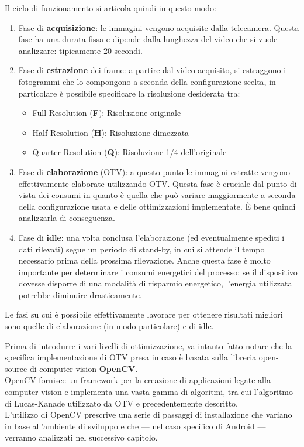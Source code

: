 Il ciclo di funzionamento si articola quindi in questo modo:
\begin{enumerate}
    \item Fase di \textbf{acquisizione}: le immagini vengono acquisite dalla telecamera. Questa fase ha una durata fissa e dipende
    dalla lunghezza del video che si vuole analizzare: tipicamente 20 secondi.
    \item Fase di \textbf{estrazione} dei frame: a partire dal video acquisito, si estraggono i fotogrammi che lo compongono a seconda
    della configurazione scelta, in particolare è possibile specificare la risoluzione desiderata tra:
    \begin{itemize}
        \item Full Resolution (\textbf{F}): Risoluzione originale
        \item Half Resolution (\textbf{H}): Risoluzione dimezzata
        \item Quarter Resolution (\textbf{Q}): Risoluzione 1/4 dell'originale
    \end{itemize}
    \item Fase di \textbf{elaborazione} (OTV): a questo punto le immagini estratte vengono effettivamente elaborate utilizzando
    OTV. Questa fase è cruciale dal punto di vista dei consumi in quanto è quella che può variare maggiormente a seconda della
    configurazione usata e delle ottimizzazioni implementate. È bene quindi analizzarla di conseguenza.
    \item Fase di \textbf{idle}: una volta conclusa l'elaborazione (ed eventualmente spediti i dati rilevati) segue un periodo di stand-by,
    in cui si attende il tempo necessario prima della prossima rilevazione. Anche questa fase è molto importante per determinare
    i consumi energetici del processo: se il dispositivo dovesse disporre di una modalità di risparmio energetico, 
    l'energia utilizzata potrebbe diminuire drasticamente.
\end{enumerate}

Le fasi su cui è possibile effettivamente lavorare per ottenere risultati migliori sono quelle di elaborazione (in modo particolare)
e di idle.


Prima di introdurre i vari livelli di ottimizzazione, va intanto fatto notare che la specifica implementazione di OTV presa in
caso è basata sulla libreria open-source di computer vision \textbf{OpenCV}.\\
OpenCV fornisce un framework per la creazione di applicazioni legate alla computer vision e implementa una vasta gamma di
algoritmi, tra cui l'algoritmo di Lucas-Kanade utilizzato da OTV e precedentemente descritto.\\
L'utilizzo di OpenCV prescrive una serie di passaggi di installazione che variano in base all'ambiente di sviluppo e che
--- nel caso specifico di Android --- verranno analizzati nel successivo capitolo.

